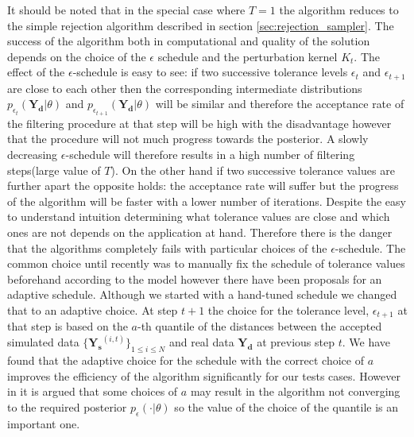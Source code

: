 It should be noted that in the special case where $T=1$ the algorithm reduces to the simple rejection algorithm described in section \ref{sec:rejection_sampler}.  The success of the algorithm both in computational and quality of the solution depends on the choice of the $\epsilon$ schedule and the perturbation kernel $K_{t}$. The effect of the $\epsilon$-schedule is easy to see: if two successive tolerance levels $\epsilon_{t}$ and $\epsilon_{t+1}$ are close to each other then the corresponding intermediate distributions $p_{\epsilon_{t}}(\mathbf{Y_{d}}|\theta)$ and $p_{\epsilon_{t+1}}(\mathbf{Y_{d}}|\theta)$  will be similar and therefore the acceptance rate of the filtering procedure at that step will be high with the disadvantage however that the procedure will not much progress towards the posterior.  A slowly decreasing $\epsilon$-schedule will therefore results in a high number of filtering steps(large value of $T$). On the other hand if two successive tolerance values are further apart the opposite holds: the acceptance rate will suffer but the progress of the algorithm will be faster with a lower number of iterations. Despite the easy to understand intuition determining what tolerance values are close and which ones are not depends on the application at hand. Therefore there is the danger that the algorithms completely fails with particular choices of the $\epsilon$-schedule. The common choice until recently was to manually fix the schedule of tolerance values beforehand according to the model however there have been proposals for an adaptive schedule. Although we started with a hand-tuned schedule we changed that to an adaptive choice. At step $t+1$ the choice for the tolerance level, $\epsilon_{t+1}$ at that step is based on the $a$-th quantile of the distances between the accepted simulated data $\{\mathbf{Y_{s}}^{(i,t)}\}_{1 \le i \le N}$ and real data $\mathbf{Y_{d}}$ at previous step $t$. We have found that the adaptive choice for the schedule with the correct choice of $a$ improves the efficiency of the algorithm significantly for our tests cases. However in \cite[] {silk2012optimizing} it is argued that some choices of $a$ may result in the algorithm not converging to the required posterior $p_{\epsilon}(\cdot| \theta)$ so the value of the choice of the quantile is an important one.

